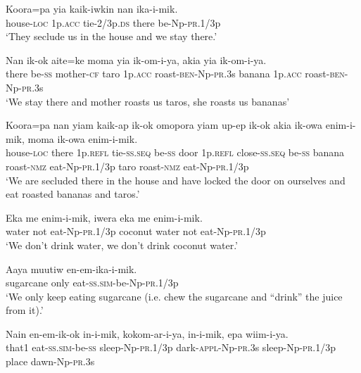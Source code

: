 \ea
\gll  Koora=pa  yia  kaik-iwkin  nan  ika-i-mik. \\
house-\textsc{loc}  1p.\textsc{acc}  tie-2/3p.\textsc{ds}  there  be-Np-\textsc{pr}.1/3p \\
\glt ‘They seclude us in the house and we stay there.’ \\
\z


\ea
\gll  Nan  ik-ok  aite=ke  moma  yia  ik-om-i-ya,          akia  yia  ik-om-i-ya. \\
there  be-\textsc{ss}  mother-\textsc{cf}  taro  1p.\textsc{acc}  roast-\textsc{ben}-Np-\textsc{pr}.3s  banana  1p.\textsc{acc}  roast-\textsc{ben}-Np-\textsc{pr}.3s \\


\glt ‘We stay there and mother roasts us taros, she roasts us bananas’ \\
\z


\ea
\gll  Koora=pa  nan  yiam  kaik-ap  ik-ok  omopora  yiam  up-ep           ik-ok  akia  ik-owa  enim-i-mik,  moma  ik-owa  enim-i-mik. \\
house-\textsc{loc}  there  1p.\textsc{refl}  tie-\textsc{ss.seq}  be-\textsc{ss}  door  1p.\textsc{refl}  close-\textsc{ss.seq} be-\textsc{ss}  banana  roast-\textsc{nmz}  eat-Np-\textsc{pr}.1/3p  taro  roast-\textsc{nmz}  eat-Np-\textsc{pr}.1/3p \\


\glt ‘We are secluded there in the house and have locked the door on ourselves and eat roasted bananas and taros.’ \\
\z


\ea
\gll  Eka  me  enim-i-mik,  iwera  eka  me  enim-i-mik. \\
water  not  eat-Np-\textsc{pr}.1/3p  coconut  water  not  eat-Np-\textsc{pr}.1/3p \\
\glt ‘We don’t drink water, we don’t drink coconut water.’ \\
\z


\ea
\gll  Aaya  muutiw  en-em-ika-i-mik. \\
sugarcane  only  eat-\textsc{ss}.\textsc{sim}-be-Np-\textsc{pr}.1/3p \\
\glt ‘We only keep eating sugarcane (i.e. chew the sugarcane and “drink” the juice from it).’ \\
\z


\ea
\gll  Nain  en-em-ik-ok  in-i-mik,  kokom-ar-i-ya,            in-i-mik,  epa  wiim-i-ya. \\
that1  eat-\textsc{ss}.\textsc{sim}-be-\textsc{ss}  sleep-Np-\textsc{pr}.1/3p  dark-\textsc{appl}-Np-\textsc{pr}.3s sleep-Np-\textsc{pr}.1/3p  place  dawn-Np-\textsc{pr}.3s \\


